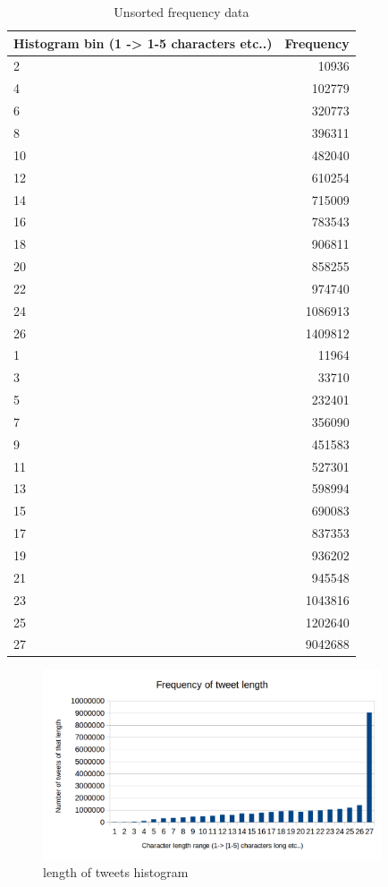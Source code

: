 \documentclass[12pt]{article}
\begin{document}
\begin{table}[h]
\centering
\caption{Unsorted frequency data}
\label{table:raw_results}
\begin{tabular}{ l r }
\hline
Histogram bin (1 -> 1-5 characters etc..) & Frequency \\
\hline
	2 &		10936 \\
	4 &		102779 \\
	6 &		320773 \\
	8 &		396311 \\
	10 &	482040 \\
	12 &	610254 \\
	14 &	715009 \\
	16 &	783543 \\
	18 &	906811 \\
	20 &	858255 \\
	22 &	974740 \\
	24 &	1086913 \\
	26 &	1409812 \\
	1 &		11964 \\
	3 &		33710 \\
	5 &		232401 \\
	7 &		356090 \\
	9 &		451583 \\
	11 &	527301 \\
	13 &	598994 \\
	15 &	690083 \\
	17 &	837353 \\
	19 &	936202 \\
	21 &	945548 \\
	23 &	1043816 \\
	25 &	1202640 \\
	27 &	9042688 \\
\end{tabular}
\end{table}

\begin{figure}
	\centering
	\caption{length of tweets histogram}
	\label{fig:length_tweets}
\includegraphics[width=10cm]{tweet_length_histogram.png}
\end{figure}
\end{document}
